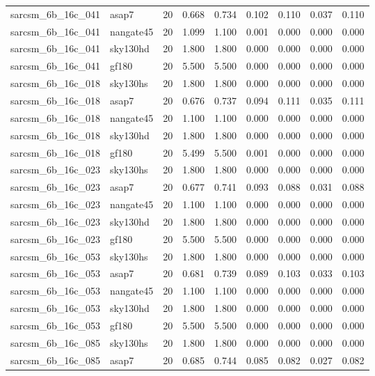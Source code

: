 \begin{tabular}{llrrrrrrr}
sarcsm\_6b\_16c\_041 & asap7 & 20 & 0.668 & 0.734 & 0.102 & 0.110 & 0.037 & 0.110 \\
sarcsm\_6b\_16c\_041 & nangate45 & 20 & 1.099 & 1.100 & 0.001 & 0.000 & 0.000 & 0.000 \\
sarcsm\_6b\_16c\_041 & sky130hd & 20 & 1.800 & 1.800 & 0.000 & 0.000 & 0.000 & 0.000 \\
sarcsm\_6b\_16c\_041 & gf180 & 20 & 5.500 & 5.500 & 0.000 & 0.000 & 0.000 & 0.000 \\
sarcsm\_6b\_16c\_018 & sky130hs & 20 & 1.800 & 1.800 & 0.000 & 0.000 & 0.000 & 0.000 \\
sarcsm\_6b\_16c\_018 & asap7 & 20 & 0.676 & 0.737 & 0.094 & 0.111 & 0.035 & 0.111 \\
sarcsm\_6b\_16c\_018 & nangate45 & 20 & 1.100 & 1.100 & 0.000 & 0.000 & 0.000 & 0.000 \\
sarcsm\_6b\_16c\_018 & sky130hd & 20 & 1.800 & 1.800 & 0.000 & 0.000 & 0.000 & 0.000 \\
sarcsm\_6b\_16c\_018 & gf180 & 20 & 5.499 & 5.500 & 0.001 & 0.000 & 0.000 & 0.000 \\
sarcsm\_6b\_16c\_023 & sky130hs & 20 & 1.800 & 1.800 & 0.000 & 0.000 & 0.000 & 0.000 \\
sarcsm\_6b\_16c\_023 & asap7 & 20 & 0.677 & 0.741 & 0.093 & 0.088 & 0.031 & 0.088 \\
sarcsm\_6b\_16c\_023 & nangate45 & 20 & 1.100 & 1.100 & 0.000 & 0.000 & 0.000 & 0.000 \\
sarcsm\_6b\_16c\_023 & sky130hd & 20 & 1.800 & 1.800 & 0.000 & 0.000 & 0.000 & 0.000 \\
sarcsm\_6b\_16c\_023 & gf180 & 20 & 5.500 & 5.500 & 0.000 & 0.000 & 0.000 & 0.000 \\
sarcsm\_6b\_16c\_053 & sky130hs & 20 & 1.800 & 1.800 & 0.000 & 0.000 & 0.000 & 0.000 \\
sarcsm\_6b\_16c\_053 & asap7 & 20 & 0.681 & 0.739 & 0.089 & 0.103 & 0.033 & 0.103 \\
sarcsm\_6b\_16c\_053 & nangate45 & 20 & 1.100 & 1.100 & 0.000 & 0.000 & 0.000 & 0.000 \\
sarcsm\_6b\_16c\_053 & sky130hd & 20 & 1.800 & 1.800 & 0.000 & 0.000 & 0.000 & 0.000 \\
sarcsm\_6b\_16c\_053 & gf180 & 20 & 5.500 & 5.500 & 0.000 & 0.000 & 0.000 & 0.000 \\
sarcsm\_6b\_16c\_085 & sky130hs & 20 & 1.800 & 1.800 & 0.000 & 0.000 & 0.000 & 0.000 \\
sarcsm\_6b\_16c\_085 & asap7 & 20 & 0.685 & 0.744 & 0.085 & 0.082 & 0.027 & 0.082 \\

\end{tabular}
